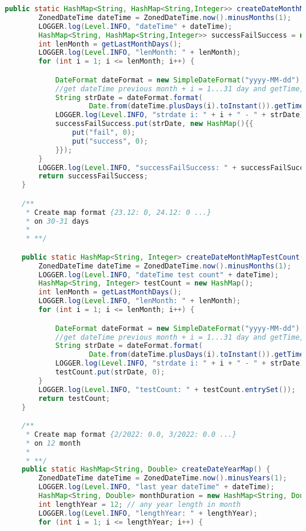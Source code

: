 \begin{lstlisting}[language=Java]
    public static HashMap<String, HashMap<String,Integer>> createDateMonthMapSuccessRate() {
        ZonedDateTime dateTime = ZonedDateTime.now().minusMonths(1);
        LOGGER.log(Level.INFO, "dateTime" + dateTime);
        HashMap<String, HashMap<String,Integer>> successFailSuccess = new HashMap();
        int lenMonth = getLastMonthDays();
        LOGGER.log(Level.INFO, "lenMonth: " + lenMonth);
        for (int i = 1; i <= lenMonth; i++) {

            DateFormat dateFormat = new SimpleDateFormat("yyyy-MM-dd");
            //get dateTime previous month + i = 1...31 day and getTime, after in strDate=2022-03-22
            String strDate = dateFormat.format(
                    Date.from(dateTime.plusDays(i).toInstant()).getTime());
            LOGGER.log(Level.INFO, "strdate i: " + i + " - " + strDate);
            successFailSuccess.put(strDate, new HashMap(){{
                put("fail", 0);
                put("success", 0);
            }});
        }
        LOGGER.log(Level.INFO, "successFailSuccess: " + successFailSuccess.entrySet());
        return successFailSuccess;
    }

    /**
     * Create map format {23.12: 0, 24.12: 0 ...}
     * on 30-31 days
     *
     * **/

    public static HashMap<String, Integer> createDateMonthMapTestCount() {
        ZonedDateTime dateTime = ZonedDateTime.now().minusMonths(1);
        LOGGER.log(Level.INFO, "dateTime test count" + dateTime);
        HashMap<String, Integer> testCount = new HashMap();
        int lenMonth = getLastMonthDays();
        LOGGER.log(Level.INFO, "lenMonth: " + lenMonth);
        for (int i = 1; i <= lenMonth; i++) {

            DateFormat dateFormat = new SimpleDateFormat("yyyy-MM-dd");
            //get dateTime previous month + i = 1...31 day and getTime, after in strDate=2022-03-22
            String strDate = dateFormat.format(
                    Date.from(dateTime.plusDays(i).toInstant()).getTime());
            LOGGER.log(Level.INFO, "strdate i: " + i + " - " + strDate);
            testCount.put(strDate, 0);
        }
        LOGGER.log(Level.INFO, "testCount: " + testCount.entrySet());
        return testCount;
    }

    /**
     * Create map format {2/2022: 0.0, 3/2022: 0.0 ...}
     * on 12 month
     *
     * **/
    public static HashMap<String, Double> createDateYearMap() {
        ZonedDateTime dateTime = ZonedDateTime.now().minusYears(1);
        LOGGER.log(Level.INFO, "last year dateTime" + dateTime);
        HashMap<String, Double> monthDuration = new HashMap<String, Double>();
        int lengthYear = 12; // any year length in month
        LOGGER.log(Level.INFO, "lengthYear: " + lengthYear);
        for (int i = 1; i <= lengthYear; i++) {


\end{lstlisting}
